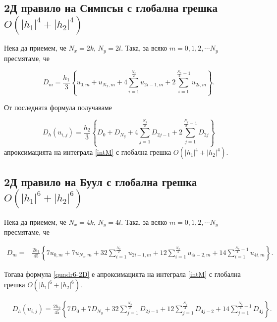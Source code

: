 \documentclass{article}
\newcommand{\rf}[1]{(\ref{#1})}
\begin{document}
\subsection{ 2Д правило на Симпсън с глобална грешка $O(|h_1|^4+|h_2|^4)$}

Нека да приемем, че $N_x=2k$, $N_y=2 l$. Така, за всяко $m=0,1,2,\cdots N_y$ пресмятаме, че

$$D_m= \frac{h_1 }{3} 
\left\{ u_{0,m}+u_{N_x,m}+ 4 \sum_{i=1}^{\frac{N_x}{2}}   u_{2i-1,m}
 +2 \sum_{i=1}^{\frac{N_x}{2}-1} u_{2i,m} \right\}.$$


От последната формула получаваме

\begin{equation}\label{quadr4}
D_h(u_{i,j}) =\frac{h_2 }{3} 
\left\{ D_{0}+D_{N_y}+ 4 \sum_{j=1}^{\frac{N_y}{2}}   D_{2j-1}
 +2 \sum_{j=1}^{{\frac{N_y}{2}}-1} D_{2j} \right\}
\end{equation}
апроксимацията на интеграла \eqref{intM} с глобална грешка $O(|h_1|^4+|h_2|^4)$.


\subsection{ 2Д правило на Буул с глобална грешка $O(|h_1|^6+|h_2|^6)$}

Нека да приемем, че $N_x=4k$, $N_y=4 l$. Така, за всяко $m=0,1,2,\cdots N_y$ пресмятаме, че

\begin{align*}
D_m =& \frac{2h_1}{45} 
\left\{
7u_{0,m}+7u_{N_x,m}+32 \sum_{i=1}^{\frac{N_x}{2}}u_{2i-1,m}
+12\sum_{i=1}^{\frac{N_x}{4}}u_{4i-2,m}
+14 \sum_{i=1}^{\frac{N_x}{4}-1}u_{4i,m}
\right\}.
\end{align*}

Тогава формула \eqref{quadr6-2D} е апроксимацията на интеграла \eqref{intM} с глобална грешка $O(|h_1|^6+|h_2|^6)$.

\begin{align}\label{quadr6-2D}
&D_h(u_{i,j})  =
\frac{2h_2}{45} 
\left\{
7D_{0}+7D_{N_y}+32 \sum_{j=1}^{\frac{N_y}{2}}D_{2j-1}
+12\sum_{j=1}^{\frac{N_y}{4}}D_{4j-2}
+14 \sum_{j=1}^{\frac{N_y}{4}-1}D_{4j}
\right\}.
\end{align}
%
%
\end{document}
